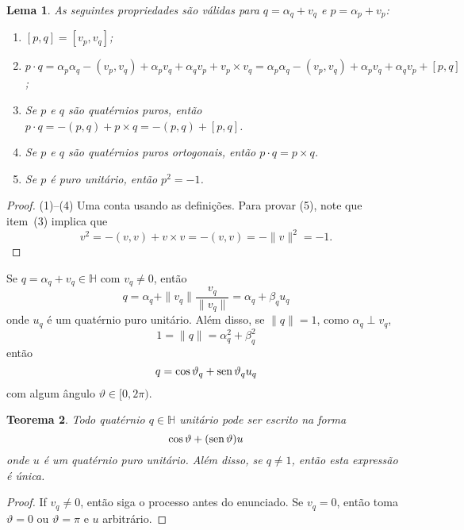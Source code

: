 \documentclass[12pt]{amsart}
\newcommand{\Ha}{\mathbb H}
\DeclareMathOperator{\sen}{\textrm{\rm sen}}
\newtheorem{theorem}{Teorema}
\newtheorem{lemma}[theorem]{Lema}
\theoremstyle{definition}
\begin{document}
\begin{lemma}
    As seguintes propriedades são válidas para $q=\alpha_q+v_q$ e $p=\alpha_p+v_p$:
    \begin{enumerate}
        \item $[p,q]=[v_p,v_q]$;
        \item $p\cdot q=\alpha_p\alpha_q-(v_p,v_q)+\alpha_p v_q+\alpha_qv_p+v_p\times v_q=\alpha_p\alpha_q-(v_p,v_q)+\alpha_p v_q+\alpha_qv_p+[p,q]$;
        \item Se $p$ e $q$ são quatérnios puros, então $p\cdot q=-(p, q)+p\times q=-(p, q)+[p,q]$.
        \item Se $p$ e $q$ são quatérnios puros ortogonais, então $p\cdot q=p\times q$.
        \item Se $p$ é puro unitário, então $p^2=-1$.
    \end{enumerate}
\end{lemma}
\begin{proof}
    (1)--(4) Uma conta usando as definições. Para provar (5), note que item~(3) implica que 
    \[
        v^2=-(v, v)+v\times v=-(v, v)=-\|v\|^2=-1. 
    \]
\end{proof}


Se $q=\alpha_q+v_q\in\Ha$ com $v_q\neq 0$, então 
\[
    q=\alpha_q+\|v_q\|\frac{v_q}{\|v_q\|}=\alpha_q+\beta_qu_q
\]
onde $u_q$ é um quatérnio puro unitário. Além disso, se $\|q\|=1$, como $\alpha_q\perp v_q$,
\[
    1=\|q\|=\alpha_q^2+\beta_q^2
\]
então 
\[
    q=\cos\vartheta_q+\sen\vartheta_qu_q
\]
com algum ângulo $\vartheta\in[0,2\pi)$.

\begin{theorem}
    Todo quatérnio $q\in\Ha$ unitário pode ser escrito na forma 
    \[
        \cos\vartheta +(\sen\vartheta) u
    \]
    onde $u$ é um quatérnio puro unitário.
    Além disso, se $q\neq 1$, então esta expressão é única.
\end{theorem}
\begin{proof}
    If $v_q\neq 0$, então siga o processo antes do enunciado. Se $v_q=0$, então toma $\vartheta=0$ ou $\vartheta =\pi$ e $u$ arbitrário.
\end{proof}
\end{document}
